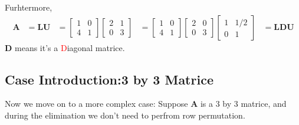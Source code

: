         Furhtermore, 
            \begin{equation}
                \begin{aligned}
                    \mathbf{A} &= \mathbf{L} \mathbf{U}
                               &= 
                               \begin{bmatrix}
                                    1 & 0 \\
                                    \boxed{4} & 1
                                \end{bmatrix}      
                                \begin{bmatrix}
                                    2 & 1\\
                                    0 & 3
                                \end{bmatrix}   
                                &=
                                \begin{bmatrix}
                                    1 & 0 \\
                                    \boxed{4} & 1
                                \end{bmatrix}    
                                \begin{bmatrix}
                                    2 & 0\\
                                    0 & 3
                                \end{bmatrix}  
                                \begin{bmatrix}
                                    1 & 1/2\\
                                    0 & 1
                                \end{bmatrix}  
                                &=
                                 \mathbf{L} \mathbf{D} \mathbf{U}          
                \end{aligned}
            \end{equation}  
        \textbf{D} means it's a \textcolor{red}{D}iagonal matrice.
        
    \subsection{Case Introduction:3 by 3 Matrice}
        Now we move on to a more complex case: Suppose \textbf{A} is a 3 by 3 matrice, and during the elimination we don't need to perfrom row permutation.
        
